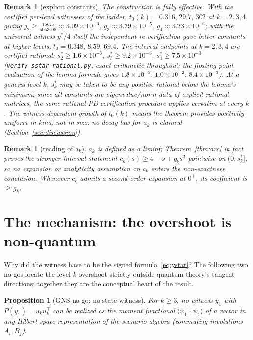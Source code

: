 \documentclass[11pt]{article}
\newtheorem{proposition}[theorem]{Proposition}
\newtheorem{remark}[theorem]{Remark}
\newcommand{\la}{\langle}
\newcommand{\ra}{\rangle}
\begin{document}
\begin{remark}[explicit constants]\label{rem:constants}
The construction is fully effective. With the certified per-level
witnesses of the ladder, $t_0(k)=0.316,\,29.7,\,302$ at $k=2,3,4$, giving
$g_2\ge\tfrac{15625}{5053008}\approx3.09\times10^{-3}$,
$g_3\approx3.29\times10^{-5}$, $g_4\approx3.23\times10^{-6}$; with the
universal witness $y^\ast/4$ itself the independent re-verification gave better constants at
higher levels, $t_0=0.348,\,8.59,\,69.4$. The interval endpoints at $k=2,3,4$ are
certified \emph{rational}: $s^\ast_2\ge1.6\times10^{-3}$,
$s^\ast_3\ge9.2\times10^{-3}$, $s^\ast_4\ge7.5\times10^{-3}$
(\texttt{verify\_sstar\_rational.py}, exact arithmetic throughout; the
floating-point evaluation of the lemma formula gives
$1.8\times10^{-3},\,1.0\times10^{-2},\,8.4\times10^{-3}$). At a general
level $k$, $s^\ast_k$ may be taken to be any positive rational below the
lemma's minimum; since all constants are eigenvalue/norm data of explicit
rational matrices, the same rational-PD certification procedure applies
verbatim at every $k$. The witness-dependent growth of $t_0(k)$ means the
theorem provides \emph{positivity uniform in kind, not in size}: no decay
law for $a_k$ is claimed (Section~\ref{sec:discussion}).
\end{remark}

\begin{remark}[reading of $a_k$]
$a_k$ is defined as a liminf; Theorem~\ref{thm:arc} in fact proves the
stronger \emph{interval} statement $c_k(s)\ge4-s+g_ks^2$ pointwise on
$(0,s^\ast_k]$, so no expansion or analyticity assumption on $c_k$ enters
the non-exactness conclusion. Whenever $c_k$ admits a second-order
expansion at $0^+$, its coefficient is $\ge g_k$.
\end{remark}

\section{The mechanism: the overshoot is non-quantum}\label{sec:mechanism}

Why did the witness have to be the signed formula~\eqref{eq:ystar}? The
following two no-gos locate the level-$k$ overshoot strictly outside
quantum theory's tangent directions; together they are the conceptual
heart of the result.

\begin{proposition}[GNS no-go: no state witness]\label{prop:gns}
For $k\ge3$, no witness $y_1$ with $P(y_1)=u_ku_k^\top$ can be realized as
the moment functional $\la\psi_1|\cdot|\psi_1\ra$ of a vector in any
Hilbert-space representation of the scenario algebra (commuting
involutions $A_i,B_j$).
\end{proposition}
\end{document}
